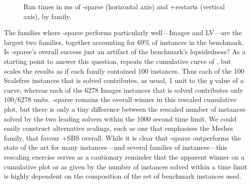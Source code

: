\begin{figure}[htb]
    \caption{Run times in ms of \McSplit-sparse (horizontal axis) and \kDown+restarts (vertical axis), by family.}
    \label{figure:mcsplit-sparse-scatter-by-family}
\end{figure}

The families where \McSplit-sparse performs particularly well---Images and LV---are
the largest two families, together accounting for 69\% of instances in the benchmark.
Is \McSplit-sparse's overall success just an artifact of the benchmark's
lopsidedness?  As a starting point to answer this question,
repeats the cumulative curve of
, but scales the results as if each family
contained 100 instances.  Thus each
of the 100 Scalefree instances that is solved contributes, as usual, 1 unit to the
$y$ value of a curve, whereas each of the 6278 Images instances that is solved
contributes only $100/6278$ units.
\McSplit-sparse remains the overall winner in this rescaled cumulative plot,
but there is only a tiny difference between the rescaled number of instances
solved by the two leading solvers within the 1000 second time limit.
We could easily construct alternative scalings, such as one that emphasises
the Meshes family, that favour \kDown+SBS overall.
While it is clear that \McSplit-sparse outperforms the state of the art
for many instances---and several families of instances---this rescaling
exercise serves as a cautionary reminder that the apparent winner
on a cumulative plot or as given by the number of instances solved within
a time limit is highly dependent on the composition of the set of
benchmark instances used.

